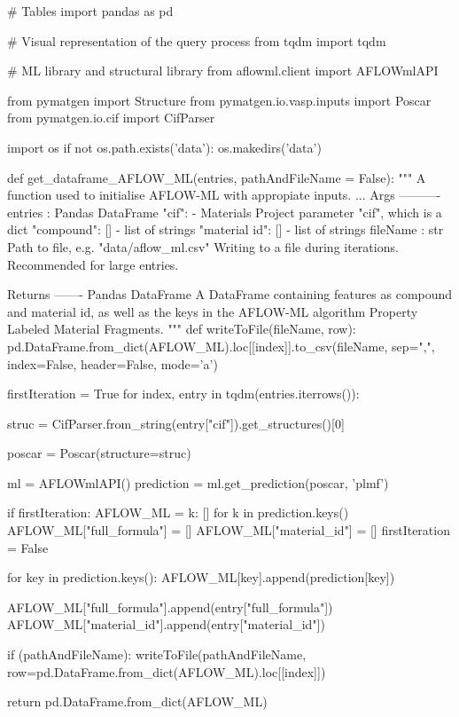 # Tables
import pandas as pd

# Visual representation of the query process
from tqdm import tqdm

# ML library and structural library
from aflowml.client import AFLOWmlAPI

from pymatgen import Structure
from pymatgen.io.vasp.inputs import Poscar
from pymatgen.io.cif import CifParser

import os
if not os.path.exists('data'):
    os.makedirs('data')

def get_dataframe_AFLOW_ML(entries, pathAndFileName = False):
    """
        A function used to initialise AFLOW-ML with appropiate inputs.
        ...
        Args
        ----------
        entries : Pandas DataFrame
        {
            "cif": {}
                - Materials Project parameter "cif", which is a dict
            "compound": []
                - list of strings
            "material id": []
                - list of strings
        }
        fileName : str
            Path to file, e.g. "data/aflow_ml.csv"
            Writing to a file during iterations. Recommended for large entries.

        Returns
        -------
        Pandas DataFrame
            A DataFrame containing features as compound and material id,
            as well as the keys in the AFLOW-ML algorithm Property
            Labeled Material Fragments.
        """
        def writeToFile(fileName, row):
            pd.DataFrame.from_dict(AFLOW_ML).loc[[index]].to_csv(fileName,
                sep=",",
                index=False,
                header=False,
                mode='a')

        firstIteration = True
        for index, entry in tqdm(entries.iterrows()):

            struc = CifParser.from_string(entry["cif"]).get_structures()[0]

            poscar = Poscar(structure=struc)

            ml = AFLOWmlAPI()
            prediction = ml.get_prediction(poscar, 'plmf')

            if firstIteration:
                AFLOW_ML = {k: [] for k in prediction.keys()}
                AFLOW_ML["full_formula"]    = []
                AFLOW_ML["material_id"] = []
                firstIteration = False

            for key in prediction.keys():
                AFLOW_ML[key].append(prediction[key])

            AFLOW_ML["full_formula"].append(entry["full_formula"])
            AFLOW_ML["material_id"].append(entry["material_id"])

            if (pathAndFileName):
                writeToFile(pathAndFileName, row=pd.DataFrame.from_dict(AFLOW_ML).loc[[index]])

        return pd.DataFrame.from_dict(AFLOW_ML)
